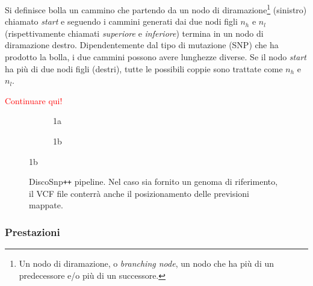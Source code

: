 \documentclass[../main.tex]{subfiles}
\begin{document}
\begin{definition}
Si definisce bolla un cammino che partendo da un nodo di diramazione\footnote{Un nodo di diramazione, o \textit{branching node}, un nodo che ha più di un predecessore e/o più di un successore.} (sinistro) chiamato \textit{start} e seguendo i cammini generati dai due nodi figli $n_h$ e $n_l$ (rispettivamente chiamati \textit{superiore} e \textit{inferiore}) termina in un nodo di diramazione destro. Dipendentemente dal tipo di mutazione (SNP) che ha prodotto la bolla, i due cammini possono avere lunghezze diverse. Se il nodo \textit{start} ha più di due nodi figli (destri), tutte le possibili coppie sono trattate come $n_h$ e $n_l$.
\end{definition}

\textcolor{red}{Continuare qui!}

\begin{figure}[ht]
\begin{subfigure}{.5\textwidth}
  \centering
  \caption{1a}
  \label{fig:sfig1}
\end{subfigure}
\begin{subfigure}{.5\textwidth}
  \centering
  \caption{1b}
  \label{fig:sfig2}
\end{subfigure}
\end{figure}

\begin{figure}[h]
	\centering
  	\captionsetup{justification=centering}
  	\caption{DiscoSnp\texttt{++} pipeline. Nel caso sia fornito un genoma di riferimento, il VCF file conterrà anche il posizionamento delle previsioni mappate.}
  	\label{fig:pipe1}
\end{figure}

\subsubsection{Prestazioni}
\end{document}
